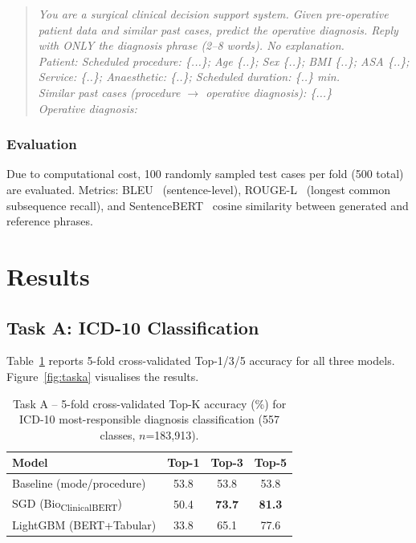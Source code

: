 \documentclass[10pt,twocolumn]{article}
\begin{document}
\begin{quote}
\small
\textit{You are a surgical clinical decision support system. Given pre-operative patient data and similar past cases, predict the operative diagnosis. Reply with ONLY the diagnosis phrase (2--8 words). No explanation.}\\
\textit{Patient: Scheduled procedure: \{...\}; Age \{..\}; Sex \{..\}; BMI \{..\}; ASA \{..\}; Service: \{..\}; Anaesthetic: \{..\}; Scheduled duration: \{..\} min.}\\
\textit{Similar past cases (procedure $\to$ operative diagnosis): \{...\}}\\
\textit{Operative diagnosis:}
\end{quote}

\subsubsection{Evaluation}
Due to computational cost, 100 randomly sampled test cases per fold (500 total) are evaluated. Metrics: BLEU~\cite{papineni2002bleu} (sentence-level), ROUGE-L~\cite{lin2004rouge} (longest common subsequence recall), and SentenceBERT~\cite{reimers2019sentence} cosine similarity between generated and reference phrases.

\section{Results}
\label{sec:results}

\subsection{Task A: ICD-10 Classification}
\label{sec:res_taska}

Table~\ref{tab:taska} reports 5-fold cross-validated Top-1/3/5 accuracy for all three models. Figure~\ref{fig:taska} visualises the results.

\begin{table}[H]
\centering
\caption{Task A -- 5-fold cross-validated Top-K accuracy (\%) for ICD-10 most-responsible diagnosis classification (557 classes, $n$=183,913).}
\label{tab:taska}
\small
\begin{tabular}{lccc}
\toprule
\textbf{Model} & \textbf{Top-1} & \textbf{Top-3} & \textbf{Top-5} \\
\midrule
Baseline (mode/procedure) & 53.8 & 53.8 & 53.8 \\
SGD (Bio\textsubscript{ClinicalBERT}) & 50.4 & \textbf{73.7} & \textbf{81.3} \\
LightGBM (BERT+Tabular) & 33.8 & 65.1 & 77.6 \\
\bottomrule
\end{tabular}
\end{table}
\end{document}
